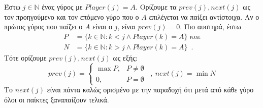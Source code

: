 {}
\begin{definition}
  Έστω $j \in \mathbb{N}$ ένας γύρος με $Player\left(j\right) = A$. Ορίζουμε τα $prev\left(j\right), next\left(j\right)$ ως
  τον προηγούμενο και τον επόμενο γύρο που ο $A$ επιλέγεται να παίξει αντίστοιχα. Αν ο πρώτος γύρος που παίζει ο $A$ είναι ο
  $j$, είναι $prev\left(j\right) = 0$. Πιο αυστηρά, έστω
  \begin{align*}
    P &= \{k \in \mathbb{N} : k < j \wedge Player\left(k\right) = A\} \mbox{ και} \\
    N &= \{k \in \mathbb{N} : k > j \wedge Player\left(k\right) = A\} \enspace.
  \end{align*}
  Τότε ορίζουμε $prev\left(j\right), next\left(j\right)$ ως εξής:
  \begin{equation*}
    prev\left(j\right) = \begin{cases}
      \max{P}, & P \neq \emptyset \\
      0, & P = \emptyset
    \end{cases} \enspace, \:
    next\left(j\right) = \min{N}
  \end{equation*}
  Το $next\left(j\right)$ είναι πάντα καλώς ορισμένο με την παραδοχή ότι μετά από κάθε γύρο όλοι οι παίκτες ξαναπαίζουν
  τελικά.
\end{definition}
